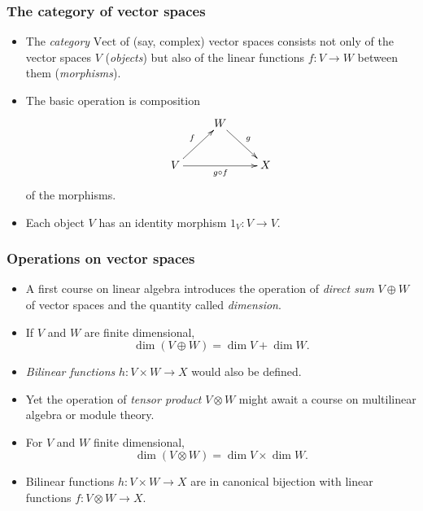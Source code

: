 \documentclass{beamer}
\newcommand{\lra}{\longrightarrow}
\begin{document}
\begin{frame}
 \frametitle{The category of vector spaces}
\begin{itemize}
\item The \emph{category} $\mathrm{Vect}$ of (say, complex) vector spaces consists not only of the vector spaces $V$ (\emph{objects}) but also of the linear functions $f:V\lra W$ between them (\emph{morphisms}).
\pause
\item The basic operation is composition
 $$
 \xymatrix{ & W \ar[dr]^g &
                \\ V \ar[ur]^f  \ar[rr]_{g\circ f} & & X
                }
 $$ 
of the morphisms.
\pause
\item Each object $V$ has an identity morphism $1_V : V \lra V$.\end{itemize}
\end{frame}

\begin{frame}
\frametitle{Operations on vector spaces}

\begin{itemize}
\item A first course on linear algebra introduces the operation of \emph{direct sum} $V \oplus W$ of vector spaces and the quantity called \emph{dimension}. 
\pause
\item If $V$ and $W$ are finite dimensional,
\[
\dim (V \oplus W) = \dim V + \dim W.
\]
\pause
\item
\emph{Bilinear functions} $h : V \times W \lra X$ would also be defined.
\pause
\item
Yet the operation of \emph{tensor product}   $V \otimes W$ might await a course on multilinear algebra or module theory.
\pause
\item
For $V$ and $W$ finite dimensional, 
\[
\dim (V \otimes W) = \dim V \times \dim W.
\]
\pause
\item
Bilinear functions $h : V \times W \lra X$ are in canonical bijection with linear functions $f : V \otimes W \lra X$.
\end{itemize}
\end{frame}
\end{document}

